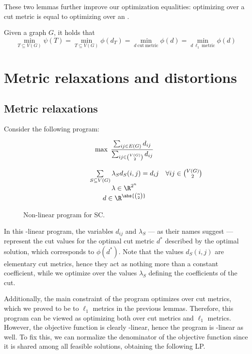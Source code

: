\documentclass[a4paper, 12pt]{report}
\begin{document}
    These two lemmas further improve our optimization equalities: optimizing over a cut metric is equal to optimizing over an .

    \begin{framedcor}[label={metric cor}]{}
        Given a graph $G$, it holds that $$\min_{T \subseteq V(G)}{\psi(T)} = \min_{T \subseteq V(G)}{\phi(d_T)} = \min_{d \ \mathrm{cut \ metric}}{\phi(d)} = \min_{d \ \ell_1 \ \mathrm{metric}}{\phi(d)}$$
    \end{framedcor}

    \section{Metric relaxations and distortions}

    \subsection{Metric relaxations}

    Consider the following program:

    \begin{figure}[H]
        \centering
        \[\begin{array}{ccl}
            \qquad\qquad\quad
            & \max \; \dfrac{\sum_{ij \in E(G)}{d_{ij}}}{\sum_{ij \in \binom{V(G)}{2}}{d_{ij}}} \\\\
            & \sum\limits_{S \subseteq V(G)}{\lambda_Sd_S(i, j)}  = d_ij & \forall ij \in \binom{V(G)}{2} \\
            & \lambda \in \R^{2^n} \\
            & d \in \R^{\abs{\binom{n}{2}}} \\
        \end{array}\]
        \caption{Non-linear program for SC.}
    \end{figure}

    In this -linear program, the variables $d_{ij}$ and $\lambda_S$ --- as their names suggest --- represent the cut values for the optimal cut metric $d^*$ described by the optimal solution, which corresponds to $\phi(d^*)$. Note that the values $d_S(i,j)$ are elementary cut metrics, hence they act as nothing more than a constant coefficient, while we optimize over the values $\lambda_S$ defining the  coefficients of the cut.

    Additionally, the main constraint of the program optimizes over cut metrics, which we proved to be  to $\ell_1$ metrics in the previous lemmas. Therefore, this program can be viewed as optimizing both over cut metrics and $\ell_1$ metrics. However, the objective function is clearly -linear, hence the program is -linear as well. To fix this, we can normalize the denominator of the objective function since it is shared among all feasible solutions, obtaining the following LP.
\end{document}

